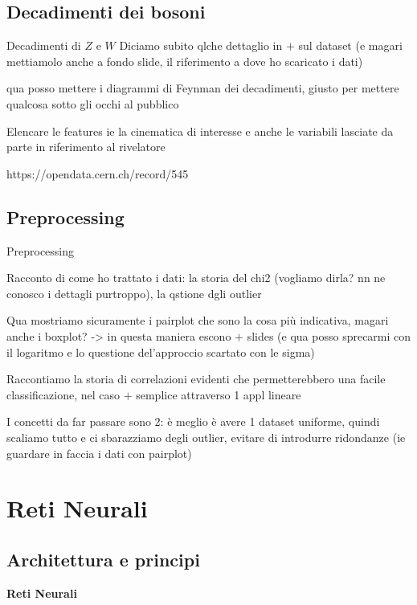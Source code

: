 \documentclass{beamer}
\begin{document}
\subsection{Decadimenti dei bosoni}
\begin{frame}{Decadimenti di $Z$ e $W$}
  Diciamo subito qlche dettaglio in $+$ sul dataset (e magari mettiamolo anche a fondo slide, il riferimento a dove ho scaricato i dati)

  qua posso mettere i diagrammi di Feynman dei decadimenti, giusto per mettere qualcosa sotto gli occhi al pubblico

  Elencare le features ie la cinematica di interesse e anche le variabili lasciate da parte in riferimento al rivelatore

  \vfill
  \begin{flushright}
    \scriptsize
    https://opendata.cern.ch/record/545
  \end{flushright}
\end{frame}

\subsection{Preprocessing}
\begin{frame}{Preprocessing}

  {\scriptsize
  Racconto di come ho trattato i dati: la storia del chi2 (vogliamo dirla? nn ne conosco i dettagli purtroppo), la qstione dgli outlier

  Qua mostriamo sicuramente i pairplot che sono la cosa più indicativa, magari anche i boxplot? -> in questa maniera escono $+$ slides (e qua posso sprecarmi con il logaritmo e lo questione del'approccio scartato con le sigma)
  
  Raccontiamo la storia di correlazioni evidenti che permetterebbero una facile classificazione, nel caso $+$ semplice attraverso 1 appl lineare

  I concetti da far passare sono 2: è meglio è avere 1 dataset uniforme, quindi scaliamo tutto e ci sbarazziamo degli outlier, evitare di introdurre ridondanze (ie guardare in faccia i dati con pairplot)
  }
\end{frame}

\section{Reti Neurali}
\subsection{Architettura e principi}
\begin{frame}
  \centering
  \Huge\bfseries
  Reti Neurali
\end{frame}
\end{document}
